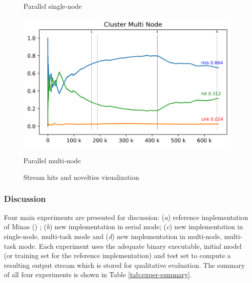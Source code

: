 \begin{figure}[htb]
\begin{minipage}{0.48\textwidth}
    \caption{Parallel single-node}
    \label{fig:cluster-sub-single}
  \end{minipage}
  \hfill
  \begin{minipage}{0.48\textwidth}
    \centering
    \includegraphics[width=1\linewidth]{experiments/tmi-n12.log.png}
    \caption{Parallel multi-node}
    \label{fig:cluster-sub-multi}
  \end{minipage}
  \caption{Stream hits and novelties visualization}
  \label{fig:visualization}
\end{figure}

\subsubsection{Discussion}

Four main experiments are presented for discussion:
(\emph{a}) reference implementation of Minas () \cite{Faria2015minas};
(\emph{b}) new implementation in serial mode;
(\emph{c}) new implementation in single-node, multi-task mode and
(\emph{d}) new implementation in multi-node, multi-task mode.
Each experiment uses the adequate binary executable, initial model
(or training set for the reference implementation) and test set
to compute a resulting output stream which is stored for qualitative evaluation.
The summary of all four experiments is shown in Table \ref{tab:exper-summary}.

